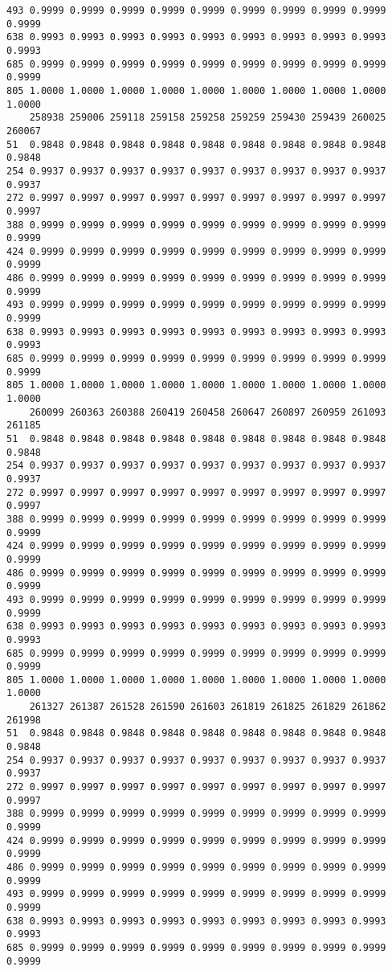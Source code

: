 \documentclass[
]{report}
\begin{document}
\begin{verbatim}
493 0.9999 0.9999 0.9999 0.9999 0.9999 0.9999 0.9999 0.9999 0.9999 0.9999
638 0.9993 0.9993 0.9993 0.9993 0.9993 0.9993 0.9993 0.9993 0.9993 0.9993
685 0.9999 0.9999 0.9999 0.9999 0.9999 0.9999 0.9999 0.9999 0.9999 0.9999
805 1.0000 1.0000 1.0000 1.0000 1.0000 1.0000 1.0000 1.0000 1.0000 1.0000
    258938 259006 259118 259158 259258 259259 259430 259439 260025 260067
51  0.9848 0.9848 0.9848 0.9848 0.9848 0.9848 0.9848 0.9848 0.9848 0.9848
254 0.9937 0.9937 0.9937 0.9937 0.9937 0.9937 0.9937 0.9937 0.9937 0.9937
272 0.9997 0.9997 0.9997 0.9997 0.9997 0.9997 0.9997 0.9997 0.9997 0.9997
388 0.9999 0.9999 0.9999 0.9999 0.9999 0.9999 0.9999 0.9999 0.9999 0.9999
424 0.9999 0.9999 0.9999 0.9999 0.9999 0.9999 0.9999 0.9999 0.9999 0.9999
486 0.9999 0.9999 0.9999 0.9999 0.9999 0.9999 0.9999 0.9999 0.9999 0.9999
493 0.9999 0.9999 0.9999 0.9999 0.9999 0.9999 0.9999 0.9999 0.9999 0.9999
638 0.9993 0.9993 0.9993 0.9993 0.9993 0.9993 0.9993 0.9993 0.9993 0.9993
685 0.9999 0.9999 0.9999 0.9999 0.9999 0.9999 0.9999 0.9999 0.9999 0.9999
805 1.0000 1.0000 1.0000 1.0000 1.0000 1.0000 1.0000 1.0000 1.0000 1.0000
    260099 260363 260388 260419 260458 260647 260897 260959 261093 261185
51  0.9848 0.9848 0.9848 0.9848 0.9848 0.9848 0.9848 0.9848 0.9848 0.9848
254 0.9937 0.9937 0.9937 0.9937 0.9937 0.9937 0.9937 0.9937 0.9937 0.9937
272 0.9997 0.9997 0.9997 0.9997 0.9997 0.9997 0.9997 0.9997 0.9997 0.9997
388 0.9999 0.9999 0.9999 0.9999 0.9999 0.9999 0.9999 0.9999 0.9999 0.9999
424 0.9999 0.9999 0.9999 0.9999 0.9999 0.9999 0.9999 0.9999 0.9999 0.9999
486 0.9999 0.9999 0.9999 0.9999 0.9999 0.9999 0.9999 0.9999 0.9999 0.9999
493 0.9999 0.9999 0.9999 0.9999 0.9999 0.9999 0.9999 0.9999 0.9999 0.9999
638 0.9993 0.9993 0.9993 0.9993 0.9993 0.9993 0.9993 0.9993 0.9993 0.9993
685 0.9999 0.9999 0.9999 0.9999 0.9999 0.9999 0.9999 0.9999 0.9999 0.9999
805 1.0000 1.0000 1.0000 1.0000 1.0000 1.0000 1.0000 1.0000 1.0000 1.0000
    261327 261387 261528 261590 261603 261819 261825 261829 261862 261998
51  0.9848 0.9848 0.9848 0.9848 0.9848 0.9848 0.9848 0.9848 0.9848 0.9848
254 0.9937 0.9937 0.9937 0.9937 0.9937 0.9937 0.9937 0.9937 0.9937 0.9937
272 0.9997 0.9997 0.9997 0.9997 0.9997 0.9997 0.9997 0.9997 0.9997 0.9997
388 0.9999 0.9999 0.9999 0.9999 0.9999 0.9999 0.9999 0.9999 0.9999 0.9999
424 0.9999 0.9999 0.9999 0.9999 0.9999 0.9999 0.9999 0.9999 0.9999 0.9999
486 0.9999 0.9999 0.9999 0.9999 0.9999 0.9999 0.9999 0.9999 0.9999 0.9999
493 0.9999 0.9999 0.9999 0.9999 0.9999 0.9999 0.9999 0.9999 0.9999 0.9999
638 0.9993 0.9993 0.9993 0.9993 0.9993 0.9993 0.9993 0.9993 0.9993 0.9993
685 0.9999 0.9999 0.9999 0.9999 0.9999 0.9999 0.9999 0.9999 0.9999 0.9999

\end{verbatim}
\end{document}
